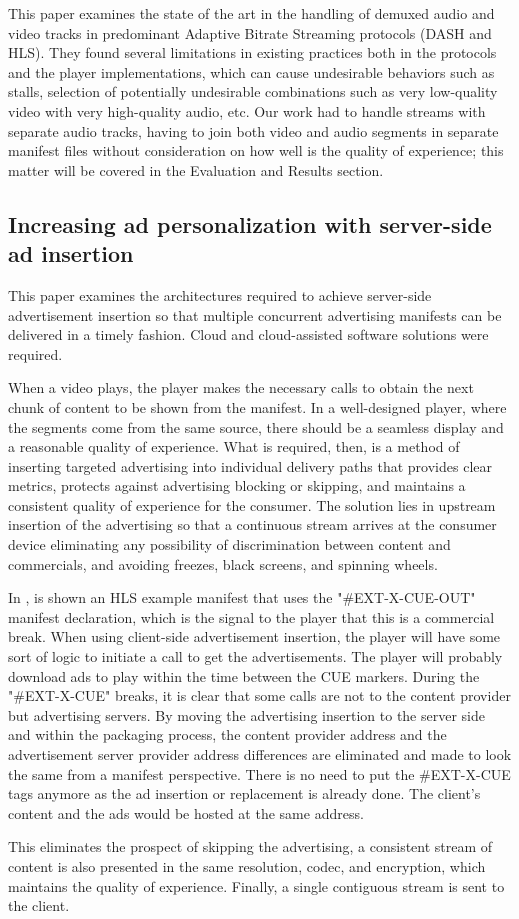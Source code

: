 This paper \cite{measures} examines the state of the art in the handling of demuxed audio and video tracks in predominant Adaptive Bitrate Streaming protocols (DASH and HLS). They found several limitations in existing practices both in the protocols and the player implementations, which can cause undesirable behaviors such as stalls, selection of potentially undesirable combinations such as very low-quality video with very high-quality audio, etc. Our work had to handle streams with separate audio tracks, having to join both video and audio segments in separate manifest files without consideration on how well is the quality of experience; this matter will be covered in the Evaluation and Results section.

\subsection{Increasing ad personalization with server-side ad insertion}

This paper \cite{ssai} examines the architectures required to achieve server-side advertisement insertion so that multiple concurrent advertising manifests can be delivered in a timely fashion. Cloud and cloud-assisted software solutions were required. 

When a video plays, the player makes the necessary calls to obtain the next chunk of content to be shown from the manifest. In a well-designed player, where the segments come from the same source, there should be a seamless display and a reasonable quality of experience. What is required, then, is a method of inserting targeted advertising into individual delivery paths that provides clear metrics, protects against advertising blocking or skipping, and maintains a consistent quality of experience for the consumer. The solution lies in upstream insertion of the advertising so that a continuous stream arrives at the consumer device eliminating any possibility of discrimination between content and commercials, and avoiding freezes, black screens, and spinning wheels.

In \cite{ssai}, is shown an HLS example manifest that uses the "\#EXT-X-CUE-OUT" manifest declaration, which is the signal to the player that this is a commercial break. When using client-side advertisement insertion, the player will have some sort of logic to initiate a call to get the advertisements. The player will probably download ads to play within the time between the CUE markers. During the "\#EXT-X-CUE" breaks, it is clear that some calls are not to the content provider but advertising servers. By moving the advertising insertion to the server side and within the packaging process, the content provider address and the advertisement server provider address differences are eliminated and made to look the same from a manifest perspective. There is no need to put the \#EXT-X-CUE tags anymore as the ad insertion or replacement is already done. The client's content and the ads would be hosted at the same address. 

This eliminates the prospect of skipping the advertising, a consistent stream of content is also presented in the same resolution, codec, and encryption, which maintains the quality of experience. Finally, a single contiguous stream is sent to the client.